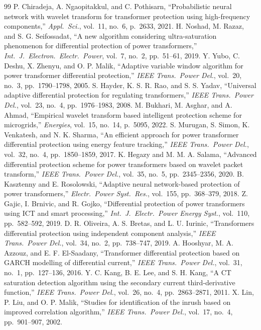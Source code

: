 \documentclass[12pt,a4paper,oneside]{report}
\begin{document}
\begin{thebibliography}{99}
 P. Chiradeja, A. Ngaopitakkul, and C. Pothisarn, ``Probabilistic neural network with wavelet transform for transformer protection using high-frequency components,'' \textit{Appl.\ Sci.}, vol.~11, no.~6, p.~2633, 2021.
 H. Noshad, M. Razaz, and S. G. Seifossadat, ``A new algorithm considering ultra-saturation phenomenon for differential protection of power transformers,'' \textit{Int.\ J.\ Electron.\ Electr.\ Power}, vol.~7, no.~2, pp.~51--61, 2019.
 Y. Yubo, C. Deshu, X. Zhenyu, and O. P. Malik, ``Adaptive variable window algorithm for power transformer differential protection,'' \textit{IEEE Trans.\ Power Del.}, vol.~20, no.~3, pp.~1790--1798, 2005.
 S. Hayder, K. S. R. Rao, and S. S. Yadav, ``Universal adaptive differential protection for regulating transformers,'' \textit{IEEE Trans.\ Power Del.}, vol.~23, no.~4, pp.~1976--1983, 2008.
 M. Bukhari, M. Asghar, and A. Ahmad, ``Empirical wavelet transform based intelligent protection scheme for microgrids,'' \textit{Energies}, vol.~15, no.~14, p.~5095, 2022.
 S. Murugan, S. Simon, K. Venkatesh, and N. K. Sharma, ``An efficient approach for power transformer differential protection using energy feature tracking,'' \textit{IEEE Trans.\ Power Del.}, vol.~32, no.~4, pp.~1850--1859, 2017.
 K. Hegazy and M. M. A. Salama, ``Advanced differential protection scheme for power transformers based on wavelet packet transform,'' \textit{IEEE Trans.\ Power Del.}, vol.~35, no.~5, pp.~2345--2356, 2020.
 B. Kasztenny and E. Rosolowski, ``Adaptive neural network-based protection of power transformers,'' \textit{Electr.\ Power Syst.\ Res.}, vol.~155, pp.~368--379, 2018.
 Z. Gajic, I. Brnivic, and R. Gojko, ``Differential protection of power transformers using ICT and smart processing,'' \textit{Int.\ J.\ Electr.\ Power Energy Syst.}, vol.~110, pp.~582--592, 2019.
 D. R. Oliveira, A. S. Bretas, and L. U. Iurinic, ``Transformers differential protection using independent component analysis,'' \textit{IEEE Trans.\ Power Del.}, vol.~34, no.~2, pp.~738--747, 2019.
 A. Hooshyar, M. A. Azzouz, and E. F. El-Saadany, ``Transformer differential protection based on GARCH modelling of differential current,'' \textit{IEEE Trans.\ Power Del.}, vol.~31, no.~1, pp.~127--136, 2016.
 Y. C. Kang, B. E. Lee, and S. H. Kang, ``A CT saturation detection algorithm using the secondary current third-derivative function,'' \textit{IEEE Trans.\ Power Del.}, vol.~26, no.~4, pp.~2863--2871, 2011.
 X. Lin, P. Liu, and O. P. Malik, ``Studies for identification of the inrush based on improved correlation algorithm,'' \textit{IEEE Trans.\ Power Del.}, vol.~17, no.~4, pp.~901--907, 2002.
\end{thebibliography}
\end{document}
